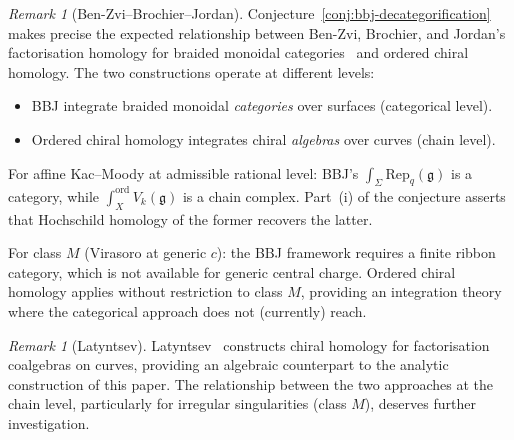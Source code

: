 \documentclass[11pt,reqno]{amsart}
\theoremstyle{definition}
\theoremstyle{remark}
\newtheorem{remark}[theorem]{Remark}
\newcommand{\fg}{\mathfrak{g}}
\numberwithin{equation}{section}
\begin{document}
\begin{remark}[Ben-Zvi--Brochier--Jordan]
\label{rem:bbj}
Conjecture~\ref{conj:bbj-decategorification} makes precise
the expected relationship between Ben-Zvi, Brochier, and
Jordan's factorisation homology for braided monoidal
categories~\cite{BBJ15,BBJ16} and ordered chiral homology.
The two constructions operate at different levels:
\begin{itemize}
\item BBJ integrate braided monoidal \emph{categories}
  over surfaces (categorical level).
\item Ordered chiral homology integrates chiral
  \emph{algebras} over curves (chain level).
\end{itemize}
For affine Kac--Moody at admissible rational level:
BBJ's $\int_\Sigma \mathrm{Rep}_q(\fg)$ is a category,
while $\int_X^{\mathrm{ord}} V_k(\fg)$ is a chain complex.
Part~(i) of the conjecture asserts that Hochschild homology
of the former recovers the latter.

For class $M$ (Virasoro at generic $c$): the BBJ
framework requires a finite ribbon category, which is
not available for generic central charge. Ordered chiral
homology applies without restriction to class $M$,
providing an integration theory where the categorical
approach does not (currently) reach.
\end{remark}

\begin{remark}[Latyntsev]
\label{rem:latyntsev}
Latyntsev~\cite{Latyntsev23} constructs chiral homology
for factorisation coalgebras on curves, providing an
algebraic counterpart to the analytic construction of
this paper. The relationship between the two approaches
at the chain level, particularly for irregular
singularities (class $M$), deserves further investigation.
\end{remark}
\end{document}
